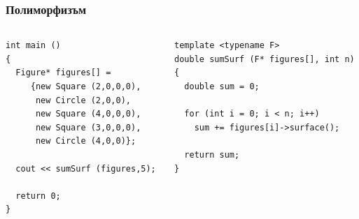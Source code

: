 \documentclass{beamer}
\begin{document}
\begin{frame}[fragile]
\frametitle{Полиморфизъм}


\begin{columns}[t]
  \begin{column}{0.5\textwidth}
\begin{flushleft}
\begin{lstlisting}
int main ()
{
  Figure* figures[] =
     {new Square (2,0,0,0),
      new Circle (2,0,0),
      new Square (4,0,0,0),
      new Square (3,0,0,0),
      new Circle (4,0,0)};

  cout << sumSurf (figures,5);

  return 0;
}
\end{lstlisting}
\end{flushleft}
  \end{column}
  \begin{column}{0.5\textwidth}


\begin{flushleft}
\begin{lstlisting}
template <typename F>
double sumSurf (F* figures[], int n)
{
  double sum = 0;

  for (int i = 0; i < n; i++)
    sum += figures[i]->surface();

  return sum;
}
\end{lstlisting}
\end{flushleft}

  \end{column}
\end{columns}




\end{frame}
\end{document}

